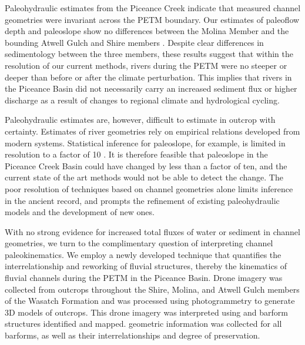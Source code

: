 \documentclass[draft]{compact_proposal}
\begin{document}

Paleohydraulic estimates from the Piceance Creek indicate that measured channel geometries were invariant across the PETM boundary.
Our estimates of paleoflow depth and paleoslope show no differences between the Molina Member and the bounding Atwell Gulch and Shire members .
Despite clear differences in sedimentology between the three members, these results suggest that within the resolution of our current methods, rivers during the PETM were no steeper or deeper than before or after the climate perturbation.
This implies that rivers in the Piceance Basin did not necessarily carry an increased sediment flux or higher discharge as a result of changes to regional climate and hydrological cycling.

Paleohydraulic estimates are, however, difficult to estimate in outcrop with certainty. Estimates of river geometries rely on empirical relations developed from modern systems.
Statistical inference for paleoslope, for example, is limited in resolution to a factor of 10 \cnote.
It is therefore feasible that paleoslope in the Piceance Creek Basin could have changed by less than a factor of ten, and the current state of the art methods would not be able to detect the change.
The poor resolution of techniques based on channel geometries alone limits inference in the ancient record, and prompts the refinement of existing paleohydraulic models and the development of new ones.


With no strong evidence for increased total fluxes of water or sediment in channel geometries, we turn to the complimentary question of interpreting channel paleokinematics.
We employ a newly developed technique that quantifies the interrelationship and reworking of fluvial structures, thereby  the kinematics of fluvial channels during the PETM in the Piceance Basin.
Drone imagery was collected from  outcrops throughout the Shire, Molina, and Atwell Gulch members of the Wasatch Formation and was processed using photogrammetry to generate 3D models of outcrops.
This drone imagery was interpreted using  and barform structures identified and mapped. geometric information was collected for all barforms, as well as their interrelationships and degree of preservation.
\end{document}

